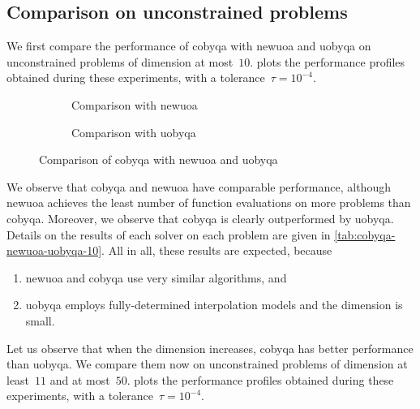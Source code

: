 \subsection{Comparison on unconstrained problems}

We first compare the performance of \gls{cobyqa} with \gls{newuoa} and \gls{uobyqa} on unconstrained problems of dimension at most~$10$.
 plots the performance profiles obtained during these experiments, with a tolerance~$\tau = 10^{-4}$.

\begin{figure}[ht]
    \centering
    \begin{subfigure}[b]{0.49\textwidth}
        \centering
        \caption{Comparison with \gls{newuoa}}
    \end{subfigure}
    \hfill
    \begin{subfigure}[b]{0.49\textwidth}
        \centering
        \caption{Comparison with \gls{uobyqa}}
    \end{subfigure}
    \caption{Comparison of \gls{cobyqa} with \gls{newuoa} and \gls{uobyqa}}
    \label{fig:cobyqa-newuoa-unconstrained}
\end{figure}

We observe that \gls{cobyqa} and \gls{newuoa} have comparable performance, although \gls{newuoa} achieves the least number of function evaluations on more problems than \gls{cobyqa}.
Moreover, we observe that \gls{cobyqa} is clearly outperformed by \gls{uobyqa}.
Details on the results of each solver on each problem are given in \cref{tab:cobyqa-newuoa-uobyqa-10}.
All in all, these results are expected, because
\begin{enumerate}
    \item \gls{newuoa} and \gls{cobyqa} use very similar algorithms, and
    \item \gls{uobyqa} employs fully-determined interpolation models and the dimension is small.
\end{enumerate}
Let us observe that when the dimension increases, \gls{cobyqa} has better performance than \gls{uobyqa}.
We compare them now on unconstrained problems of dimension at least~$11$ and at most~$50$.
 plots the performance profiles obtained during these experiments, with a tolerance~$\tau = 10^{-4}$.

